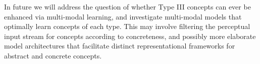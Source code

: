 \documentclass[11pt]{article}
\begin{document}
In future we will address the question of whether Type III concepts can ever be enhanced via multi-modal learning, and investigate multi-modal models that optimally learn concepts of each type. This may involve filtering the perceptual input stream for concepts according to concreteness, and possibly more elaborate model architectures that facilitate distinct representational frameworks for abstract and concrete concepts.

 








\end{document}
